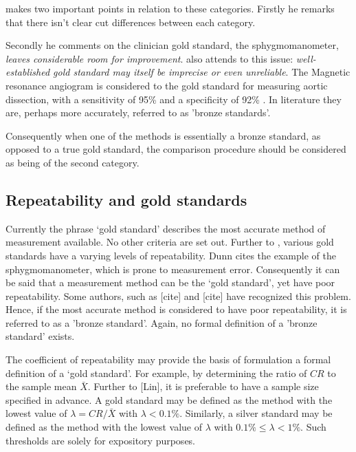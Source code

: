 \documentclass[12pt, a4paper]{article}
\begin{document}
\bigskip
\citet{DunnSEME} makes two important points in relation to these
categories. Firstly he remarks that there isn't clear cut
differences between each category.

Secondly he comments on the clinician gold standard, the
sphygmomanometer, \emph{leaves considerable room for improvement}.
\citet{pizzi} also attends to this issue: \emph{well-established
	gold standard may itself be imprecise or even unreliable}.
\bigskip
The Magnetic resonance angiogram is considered to the gold
standard for measuring aortic dissection, with a sensitivity of
95\% and a specificity of 92\% . \citep{ACR}
\bigskip
In literature they are, perhaps more accurately, referred to as
'bronze standards'.
\bigskip

Consequently when one of the methods is essentially a bronze
standard, as opposed to a true gold standard, the comparison
procedure should be considered as being of the second category.

\subsection{Repeatability and gold standards}
Currently the phrase `gold standard' describes the most accurate method of measurement available. No other criteria are set out. Further to \citet{dunnSEME}, various gold standards have a varying levels of repeatability. Dunn cites the example of the sphygmomanometer, which is prone to measurement error. Consequently it can be said that a measurement method can be the `gold standard', yet have poor repeatability. Some authors, such as [cite] and [cite] have recognized this problem. Hence, if the most accurate method is considered to have poor repeatability, it is referred to as a 'bronze standard'.  Again, no formal definition of a 'bronze standard' exists.

The coefficient of repeatability may provide the basis of formulation a formal definition of a `gold standard'. For example, by determining the ratio of $CR$ to the sample mean $\bar{X}$. Further to [Lin], it is preferable to have a sample size specified in advance. A gold standard may be defined as the method with the lowest value of $\lambda = CR /\bar{X}$ with $\lambda < 0.1\%$. Similarly, a silver standard may be defined as the method with the lowest value of $\lambda $ with $0.1\% \leq \lambda < 1\%$. Such thresholds are solely for expository purposes.




\end{document}
